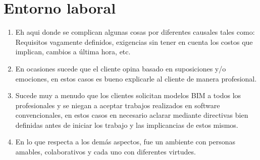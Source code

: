 \section{Entorno laboral}
\begin{enumerate}
	\item Eh aqui donde se complican algunas cosas por diferentes causales tales como: Requisitos vagamente definidos, exigencias sin tener en cuenta los costos que implican, cambios a última hora, etc.
	\item En ocasiones sucede que el cliente opina basado en suposiciones y/o emociones, en estos casos es bueno explicarle al cliente de manera profesional.
	\item Sucede muy a menudo que los clientes solicitan modelos BIM a todos los profesionales y se niegan a aceptar trabajos realizados en software convencionales, en estos casos en necesario aclarar mediante directivas bien definidas antes de iniciar los trabajo y las implicancias de estos mismos.
	\item En lo que respecta a los demás aspectos, fue un ambiente con personas amables, colaborativos y cada uno con diferentes virtudes.
\end{enumerate}